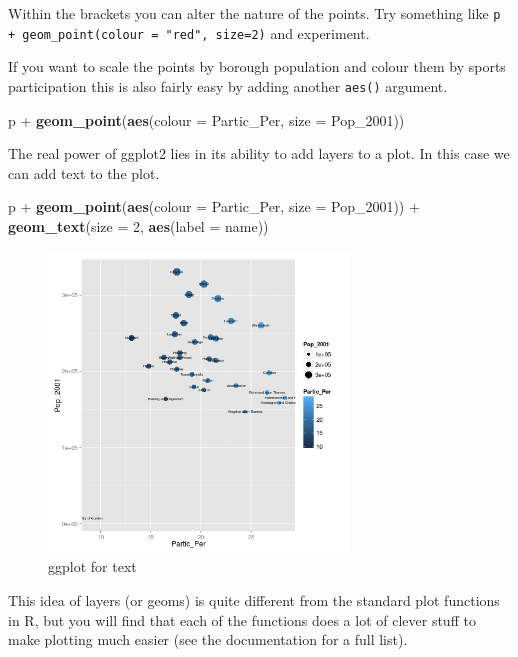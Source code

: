 \documentclass[]{article}
\newenvironment{Shaded}{}{}
\newcommand{\KeywordTok}[1]{\textcolor[rgb]{0.00,0.44,0.13}{\textbf{{#1}}}}
\newcommand{\DataTypeTok}[1]{\textcolor[rgb]{0.56,0.13,0.00}{{#1}}}
\newcommand{\DecValTok}[1]{\textcolor[rgb]{0.25,0.63,0.44}{{#1}}}
\newcommand{\NormalTok}[1]{{#1}}
\begin{document}
Within the brackets you can alter the nature of the points. Try
something like \texttt{p + geom\_point(colour = "red", size=2)} and
experiment.

If you want to scale the points by borough population and colour them by
sports participation this is also fairly easy by adding another
\texttt{aes()} argument.

\begin{Shaded}
\begin{Highlighting}[]
\NormalTok{p + }\KeywordTok{geom_point}\NormalTok{(}\KeywordTok{aes}\NormalTok{(}\DataTypeTok{colour =} \NormalTok{Partic_Per, }\DataTypeTok{size =} \NormalTok{Pop_2001))}
\end{Highlighting}
\end{Shaded}
The real power of ggplot2 lies in its ability to add layers to a plot.
In this case we can add text to the plot.

\begin{Shaded}
\begin{Highlighting}[]
\NormalTok{p + }\KeywordTok{geom_point}\NormalTok{(}\KeywordTok{aes}\NormalTok{(}\DataTypeTok{colour =} \NormalTok{Partic_Per, }\DataTypeTok{size =} \NormalTok{Pop_2001)) + }\KeywordTok{geom_text}\NormalTok{(}\DataTypeTok{size =} \DecValTok{2}\NormalTok{, }
    \KeywordTok{aes}\NormalTok{(}\DataTypeTok{label =} \NormalTok{name))}
\end{Highlighting}
\end{Shaded}
\begin{figure}[htbp]
\centering
\includegraphics[width=8cm]{figure/ggplot_for_text.png}
\caption{ggplot for text}
\end{figure}

This idea of layers (or geoms) is quite different from the standard plot
functions in R, but you will find that each of the functions does a lot
of clever stuff to make plotting much easier (see the documentation for
a full list).
\end{document}
